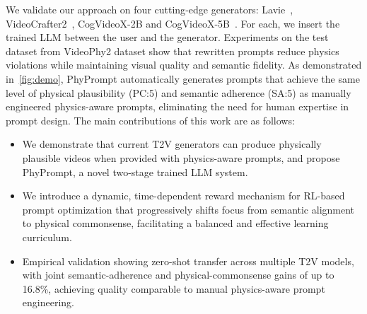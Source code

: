 We validate our approach on four cutting‑edge generators: Lavie~\cite{wang2023lavie}, VideoCrafter2~\cite{chen2024videocrafter2}, CogVideoX-2B and CogVideoX-5B~\cite{wang2024cogvideodex}.
For each, we insert the trained LLM between the user and the generator.
Experiments on the test dataset from VideoPhy2 dataset show that rewritten prompts reduce physics violations while maintaining visual quality and semantic fidelity.
As demonstrated in~\cref{fig:demo}, PhyPrompt automatically generates prompts that achieve the same level of physical plausibility (PC:5) and semantic adherence (SA:5) as manually engineered physics-aware prompts, eliminating the need for human expertise in prompt design.
The main contributions of this work are as follows:
\begin{itemize}
    \item We demonstrate that current T2V generators can produce physically plausible videos when provided with physics-aware prompts, and propose PhyPrompt, a novel two-stage trained LLM system.
    \item We introduce a dynamic, time-dependent reward mechanism for RL-based prompt optimization that progressively shifts focus from semantic alignment to physical commonsense, facilitating a balanced and effective learning curriculum.
      \item Empirical validation showing zero-shot transfer across multiple T2V models, with joint semantic-adherence and physical-commonsense gains of up to 16.8\%, achieving quality comparable to manual physics-aware prompt engineering.
\end{itemize}
